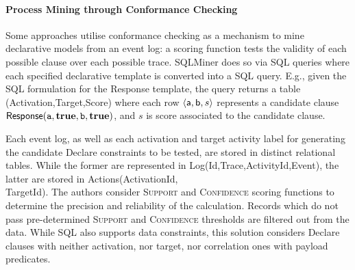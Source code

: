 \paragraph*{Process Mining through Conformance Checking}
Some approaches utilise conformance checking as a mechanism to mine declarative {models}  from an event log: a scoring function tests %
the validity of each possible clause over each possible trace. %
SQLMiner \cite{SchonigRCJM16} {does so via} SQL queries \cite{Schonig15} {where e}ach specified declarative {template} %
{is} converted into a SQL query. E.g., given the SQL formulation for the \textsf{Response} template, the query returns a table \textsf{(Activation,Target,Score)} where each row $\braket{\textsf{a},\textsf{b},s}$ represents a candidate clause $\textsf{Response}(\texttt{a},\textbf{true},\texttt{b},\textbf{true})$, and $s$ is   score associated to the candidate clause.

Each event log, as well as each activation and target activity label for generating the candidate Declare constraints to be tested, are stored in distinct relational tables. While the former are represented in  \textsf{Log(Id,Trace,ActivityId,Event)}, the latter are stored in \textsf{Actions(ActivationId,\\TargetId)}. The authors consider 
\textsc{Support} and \textsc{Confidence} scoring functions to determine the precision and reliability of the calculation. Records which do not pass pre-determined \textsc{Support} and \textsc{Confidence} thresholds are filtered out from the data. While SQL also supports data constraints, this solution considers Declare clauses with neither activation, nor target, %
nor correlation ones with payload predicates.

